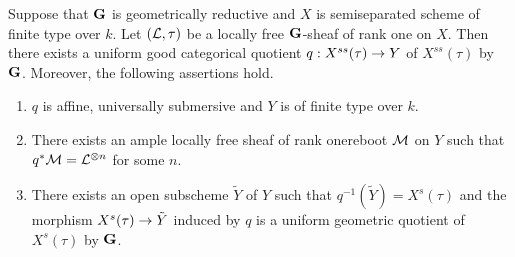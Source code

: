 \begin{theorem}\label{theorem:quotient_determined_by_linearization}
Suppose that $\mathbf{G}$ is geometrically reductive and $X$ is semiseparated scheme of finite type over $k$. Let $({\mathcal L},\tau)$ be a locally free $\mathbf{G}$-sheaf of rank one on $X$. Then there exists a uniform good categorical quotient $q:X^{ss}(\tau)\rightarrow Y$ of $X^{ss}(\tau)$ by $\mathbf{G}$. Moreover, the following assertions hold.
\begin{enumerate}[label=\emph{\textbf{(\arabic*)}}, leftmargin=3.0em]
\item $q$ is affine, universally submersive and $Y$ is of finite type over $k$.
\item There exists an ample locally free sheaf of rank onereboot
 ${\mathcal M}$ on $Y$ such that $q^*{\mathcal M} = {\mathcal L}^{\otimes n}$ for some $n$.
\item There exists an open subscheme $\tilde{Y}$ of $Y$ such that $q^{-1}(\tilde{Y}) = X^s(\tau)$ and the morphism $X^s(\tau)\rightarrow \tilde{Y}$ induced by $q$ is a uniform geometric quotient of $X^s(\tau)$ by $\mathbf{G}$.
\end{enumerate}
\end{theorem}
